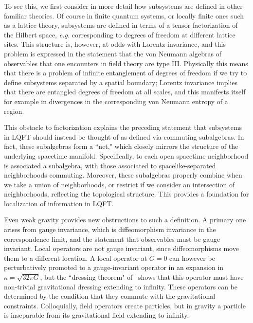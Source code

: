 To see this, we first consider in more detail how subsystems are defined in other familiar theories.  Of course in finite quantum systems, or locally finite ones such as a lattice theory, subsystems are defined in terms of a tensor factorization of the Hilbert space, {\it e.g.} corresponding to degrees of freedom at different lattice sites.  This structure is, however, at odds with Lorentz invariance, and this problem is expressed in the statement that the von Neumann algebras of observables that one encounters in field theory are type III.  Physically this means that there is a problem of infinite entanglement of degrees of freedom if we try to define subsystems separated by a spatial boundary; Lorentz invariance implies that there are entangled degrees of freedom at all scales, and this manifests itself for example in divergences in the corresponding von Neumann entropy of a region.  

This obstacle to factorization explains the preceding statement that subsystems in LQFT should instead be thought of as defined via commuting subalgebras.  In fact, these subalgebras form a ``net," which closely mirrors the structure of the underlying spacetime manifold\Haag.  Specifically, to each open spacetime neighborhood is associated a subalgebra, with those associated to spacelike-separated neighborhoods commuting.  Moreover, these subalgebras properly combine when we take a union of neighborhoods, or restrict if we consider an intersection of neighborhoods, reflecting the topological structure.  This provides a foundation for localization of information in LQFT.

Even weak gravity provides new obstructions to such a definition.  A primary one arises from gauge invariance, which is diffeomorphism invariance in the correspondence limit, and the statement that observables must be gauge invariant.  Local operators are not gauge invariant, since diffeomorphisms move them to a different location.  A local operator at $G=0$ can however be perturbatively promoted to a gauge-invariant operator\DoGione{} in an expansion in $\kappa=\sqrt{32\pi G}$, but the ``dressing theorem" of \DoGitwo\ shows that this operator must have non-trivial gravitational dressing extending to infinity.  These operators can be determined by the condition that they commute with the gravitational constraints.  Colloquially, field operators create particles, but in gravity a particle is inseparable from its gravitational field extending to infinity.

